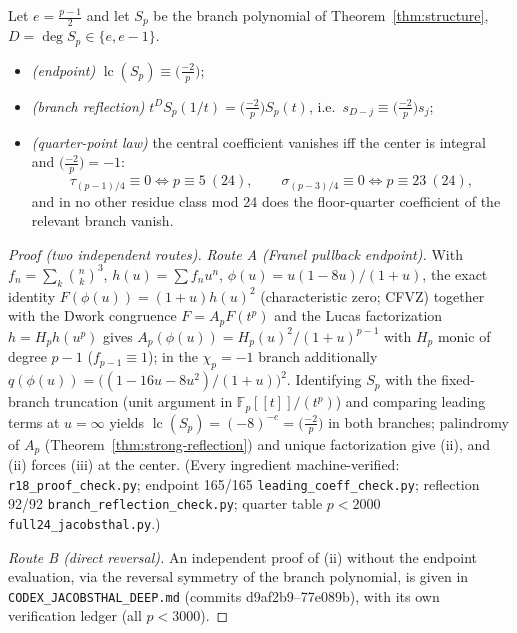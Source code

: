 \begin{theorem}\label{thm:apparition}
Let $e=\tfrac{p-1}2$ and let $S_p$ be the branch polynomial of
Theorem~\ref{thm:structure}, $D=\deg S_p\in\{e,e-1\}$.
\begin{itemize}
\item[(i)] \emph{(endpoint)} $\operatorname{lc}(S_p)\equiv\bigl(\tfrac{-2}p\bigr)$;
\item[(ii)] \emph{(branch reflection)}
$t^{D}S_p(1/t)=\bigl(\tfrac{-2}p\bigr)S_p(t)$, i.e.\
$s_{D-j}\equiv\bigl(\tfrac{-2}p\bigr)s_j$;
\item[(iii)] \emph{(quarter-point law)} the central coefficient vanishes iff
the center is integral and $\bigl(\tfrac{-2}p\bigr)=-1$:
\[
\tau_{(p-1)/4}\equiv0 \iff p\equiv5\ (24),\qquad
\sigma_{(p-3)/4}\equiv0 \iff p\equiv23\ (24),
\]
and in no other residue class mod 24 does the floor-quarter coefficient of
the relevant branch vanish.
\end{itemize}
\end{theorem}

\begin{proof}[Proof (two independent routes)]
\emph{Route A (Franel pullback endpoint).}  With $f_n=\sum_k\binom nk^3$,
$h(u)=\sum f_nu^n$, $\phi(u)=u(1-8u)/(1+u)$, the exact identity
$F(\phi(u))=(1+u)h(u)^2$ (characteristic zero; CFVZ) together with the Dwork
congruence $F=A_pF(t^p)$ and the Lucas factorization $h=H_ph(u^p)$ gives
$A_p(\phi(u))=H_p(u)^2/(1+u)^{p-1}$ with $H_p$ monic of degree $p-1$
($f_{p-1}\equiv1$); in the $\chi_p=-1$ branch additionally
$q(\phi(u))=\bigl((1-16u-8u^2)/(1+u)\bigr)^2$.  Identifying $S_p$ with the
fixed-branch truncation (unit argument in $\mathbb F_p[[t]]/(t^p)$) and
comparing leading terms at $u=\infty$ yields
$\operatorname{lc}(S_p)=(-8)^{-e}=\bigl(\tfrac{-2}p\bigr)$ in both branches;
palindromy of $A_p$ (Theorem~\ref{thm:strong-reflection}) and unique
factorization give (ii), and (ii) forces (iii) at the center.
(Every ingredient machine-verified: \texttt{r18\_proof\_check.py};
endpoint 165/165 \texttt{leading\_coeff\_check.py}; reflection 92/92
\texttt{branch\_reflection\_check.py}; quarter table $p<2000$
\texttt{full24\_jacobsthal.py}.)

\emph{Route B (direct reversal).}  An independent proof of (ii) without the
endpoint evaluation, via the reversal symmetry of the branch polynomial, is
given in \texttt{CODEX\_JACOBSTHAL\_DEEP.md} (commits d9af2b9--77e089b), with
its own verification ledger (all $p<3000$).
\end{proof}

